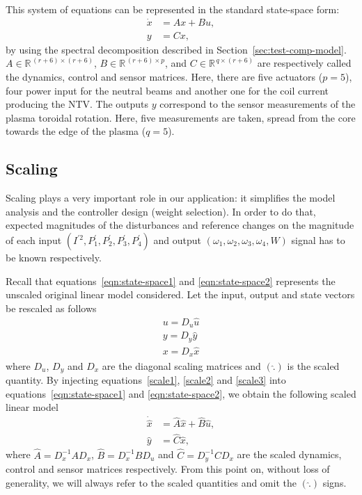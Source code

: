 \documentclass[12pt,lot, lof]{puthesis}
\begin{document}
%
This system of equations can be represented in the standard state-space form:
\begin{align}
 \dot{x} &= A x + B u ,\label{eqn:state-space1} \\
 y &= C x, \label{eqn:state-space2} 
\end{align}
by using the spectral decomposition described in Section~\ref{sec:test-comp-model}.
$A \in \mathbb{R}^{\, (r+6) \times (r+6)}$, $B \in \mathbb{R}^{\,(r+6) \times p}$, and $C \in \mathbb{R}^{\, q \times (r+6)}$ are respectively called the dynamics, control and sensor matrices.
Here, there are five actuators ($p=5$), four power input for the neutral beams and another one for the coil current producing the NTV.
The outputs $y$ correspond to the sensor measurements of the plasma toroidal rotation. Here, five measurements are taken, spread from the core towards the edge of the plasma ($q=5$).
\subsection{Scaling}
Scaling plays a very important role in our application: it simplifies the model analysis and the controller design (weight selection). In order to do that, expected magnitudes of the disturbances and reference changes on the magnitude of each input $\left( I^{'2}, P^{'}_1, P^{'}_2, P^{'}_3, P^{'}_4 \right)$ and output $\left( \omega_1,  \omega_2,  \omega_3,  \omega_4,  W \right) $ signal has to be known respectively.

Recall that equations~\ref{eqn:state-space1} and \ref{eqn:state-space2} represents the unscaled original linear model considered. Let the input, output and state vectors be rescaled as follows
\begin{eqnarray}
 u = D_u \hat{u} \label{scale1}\\
 y= D_y \hat{y} \label{scale2} \\
 x = D_x \hat{x} \label{scale3}
 \end{eqnarray}
where $D_u$, $D_y$ and $D_x$ are the diagonal scaling matrices and $\left( \hat{.} \right)$ is the scaled quantity. By injecting equations~\ref{scale1}, \ref{scale2} and \ref{scale3} into equations~\ref{eqn:state-space1} and \ref{eqn:state-space2}, we obtain the following scaled linear model
\begin{align}
 \dot{\hat{x}} &=  \hat{A} \hat{x} + \hat{B} \hat{u} ,\label{sc-space1} \\
 \hat{y} &= \hat{C} \hat{x}, \label{sc-space2} 
\end{align}
where $\hat{A} =  D_x^{-1} A D_x$, $\hat{B}=D_x^{-1} B D_u $ and $\hat{C} = D_y^{-1} C D_x$ are the scaled dynamics, control and sensor matrices respectively.
From this point on, without loss of generality, we will always refer to the scaled quantities and omit the $(\hat{.})$ signs.
\end{document}
